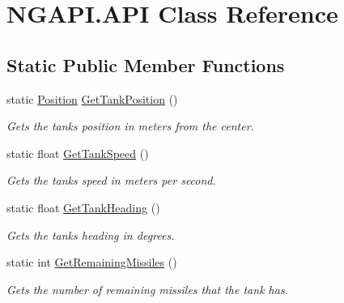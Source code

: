 \hypertarget{class_n_g_a_p_i_1_1_a_p_i}{}\section{N\+G\+A\+P\+I.\+A\+PI Class Reference}
\label{class_n_g_a_p_i_1_1_a_p_i}
\subsection*{Static Public Member Functions}
\begin{DoxyCompactItemize}
\item 
\mbox{\label{class_n_g_a_p_i_1_1_a_p_i_aa2d9caed17f411f77fb61d1256b0d75c}} 
static \hyperlink{struct_n_g_a_p_i_1_1_position}{Position} \hyperlink{class_n_g_a_p_i_1_1_a_p_i_aa2d9caed17f411f77fb61d1256b0d75c}{Get\+Tank\+Position} ()
\begin{DoxyCompactList}\small\item\em Gets the tank\textquotesingle{}s position in meters from the center. \end{DoxyCompactList}\item 
\mbox{\label{class_n_g_a_p_i_1_1_a_p_i_ad901bdd1f872b2c13a4e2b1cca5e7d5d}} 
static float \hyperlink{class_n_g_a_p_i_1_1_a_p_i_ad901bdd1f872b2c13a4e2b1cca5e7d5d}{Get\+Tank\+Speed} ()
\begin{DoxyCompactList}\small\item\em Gets the tank\textquotesingle{}s speed in meters per second. \end{DoxyCompactList}\item 
\mbox{\label{class_n_g_a_p_i_1_1_a_p_i_ac3e50a4e2991c7beba3b03b9c542b126}} 
static float \hyperlink{class_n_g_a_p_i_1_1_a_p_i_ac3e50a4e2991c7beba3b03b9c542b126}{Get\+Tank\+Heading} ()
\begin{DoxyCompactList}\small\item\em Gets the tank\textquotesingle{}s heading in degrees. \end{DoxyCompactList}\item 
\mbox{\label{class_n_g_a_p_i_1_1_a_p_i_aebf82b1209f606133c0413234eb81661}} 
static int \hyperlink{class_n_g_a_p_i_1_1_a_p_i_aebf82b1209f606133c0413234eb81661}{Get\+Remaining\+Missiles} ()
\begin{DoxyCompactList}\small\item\em Gets the number of remaining missiles that the tank has. \end{DoxyCompactList}\item 

\end{DoxyCompactItemize}
